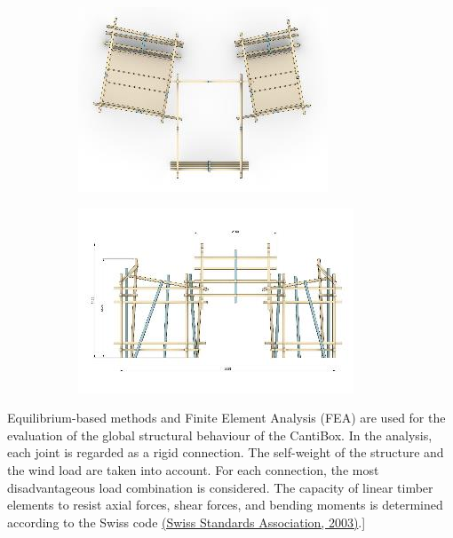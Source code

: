 \documentclass[11pt]{book}
\begin{document}
\begin{figure}[H]
\centering
\begin{subfigure}[b]{0.45\textwidth}
\centering
\includegraphics[width=\textwidth]{./images/image23.jpeg}
\end{subfigure}
\hfill
\begin{subfigure}[b]{0.45\textwidth}
\centering
\includegraphics[width=\textwidth]{./images/image24.jpeg}
\end{subfigure}
\end{figure}


Equilibrium-based methods and Finite Element Analysis (FEA) are used for the evaluation of the global structural behaviour of the CantiBox. In the analysis, each joint is regarded as a rigid connection. The self-weight of the structure and the wind load are taken into account. For each connection, the most disadvantageous load combination is considered. The capacity of linear timber elements to resist axial forces, shear forces, and bending moments is determined according to the Swiss code \href{https://www.zotero.org/google-docs/?canbQk}{(Swiss Standards Association, 2003)}.]
\end{document}
